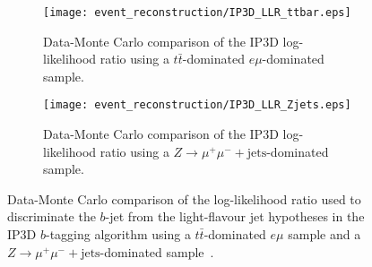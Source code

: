 \begin{figure}[htbp]
 \centering
 \begin{subfigure}[t]{0.48\textwidth}
  \centering
  \texttt{[image: event\_reconstruction/IP3D\_LLR\_ttbar.eps]}
  \caption[Data-Monte Carlo comparison of the IP3D log-likelihood ratio using a $t\bar{t}$-dominated $e\mu$ sample.]{%
   Data-Monte Carlo comparison of the IP3D log-likelihood ratio using a $t\bar{t}$-dominated $e\mu$-dominated sample.}
  \label{fig:IP3D_LLR_ttbar}
 \end{subfigure}%
 \quad
 \begin{subfigure}[t]{0.48\textwidth}
  \centering
  \texttt{[image: event\_reconstruction/IP3D\_LLR\_Zjets.eps]}
  \caption[Data-Monte Carlo comparison of the IP3D log-likelihood ratio using a $Z\to \mu^{+}\mu^{-}+\textrm{jets}$-dominated sample.]{%
   Data-Monte Carlo comparison of the IP3D log-likelihood ratio using a $Z\to \mu^{+}\mu^{-}+\textrm{jets}$-dominated sample.}
  \label{fig:IP3D_LLR_Zjets}
 \end{subfigure}%
 \caption[Data-Monte Carlo comparison of the log-likelihood ratio used to discriminate the $b$-jet from the light-flavour jet hypotheses in the IP3D $b$-tagging algorithm using different samples.]{%
  Data-Monte Carlo comparison of the log-likelihood ratio used to discriminate the $b$-jet from the light-flavour jet hypotheses in the IP3D $b$-tagging algorithm using a $t\bar{t}$-dominated $e\mu$ sample and a ${Z\to \mu^{+}\mu^{-}+\textrm{jets}}$-dominated sample~\cite{ATL-PHYS-PUB-2017-013}.}
 \label{fig:IP3D_LLR}
\end{figure}

